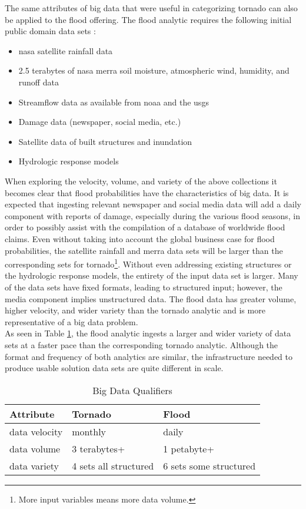 The same attributes of big data that were useful in categorizing tornado can also be applied to the flood offering. The flood analytic requires the following initial public domain data sets \cite{walker}:
\begin{itemize}
    \item \gls{nasa} satellite rainfall data
    \item 2.5 terabytes of \gls{nasa} \gls{merra} soil moisture, atmospheric wind, humidity, and runoff data
    \item Streamflow data as available from \gls{noaa} and the \gls{usgs}
    \item Damage data (newspaper, social media, etc.)
    \item Satellite data of built structures and inundation
    \item Hydrologic response models
\end{itemize}
When exploring the velocity, volume, and variety of the above collections it becomes clear that flood probabilities have the characteristics of big data. It is expected that ingesting relevant newspaper and social media data will add a daily component with reports of damage, especially during the various flood seasons, in order to possibly assist with the compilation of a database of worldwide flood claims. Even without taking into account the global business case for flood probabilities, the satellite rainfall and \gls{merra} data sets will be larger than the corresponding sets for tornado\footnote{More input variables means more data volume.}. Without even addressing existing structures or the hydrologic response models, the entirety of the input data set is larger. Many of the data sets have fixed formats, leading to structured input; however, the media component implies unstructured data. The flood data has greater volume, higher velocity, and wider variety than the tornado analytic and is more representative of a big data problem.\\

As seen in Table \ref{qualifiers}, the flood analytic ingests a larger and wider variety of data sets at a faster pace than the corresponding tornado analytic. Although the format and frequency of both analytics are similar, the infrastructure needed to produce usable solution data sets are quite different in scale.
\begin{table}[htbp]
    \centering
    \begin{tabular}{l l l}
        \hline
        Attribute & Tornado & Flood\\ [0.5ex]
        \hline
        data velocity & monthly & daily\\
        data volume &  3 terabytes+  & 1 petabyte+\\
        data variety &  4 sets all structured & 6 sets some structured\\
        \hline
    \end{tabular}
    \caption{Big Data Qualifiers}
    \label{qualifiers}
\end{table}
